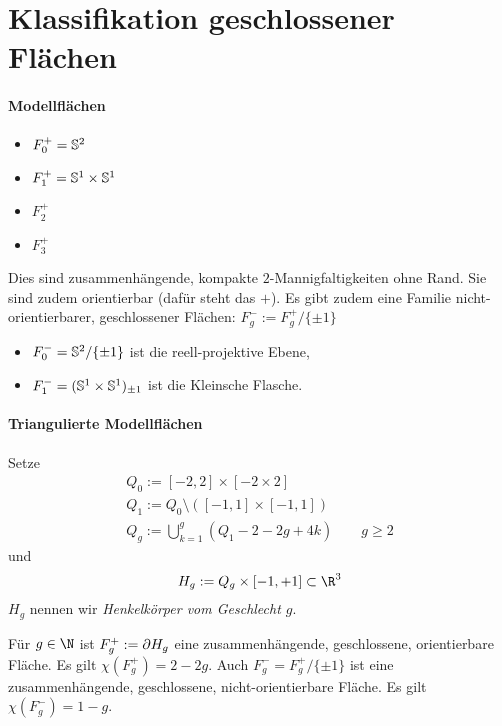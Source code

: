 \section{Klassifikation geschlossener Flächen}

\paragraph{Modellflächen}

\begin{ex}
	\begin{itemize}
		\item
			$F_0^+ = \S^2$
		\item
			$F_1^+ = \S^1 \times \S^1$
		\item
			$F_2^+$
		\item
			$F_3^+$
	\end{itemize}
	Dies sind zusammenhängende, kompakte $2$-Mannigfaltigkeiten ohne Rand.
	Sie sind zudem orientierbar (dafür steht das $+$).
	Es gibt zudem eine Familie nicht-orientierbarer, geschlossener Flächen: $F_g^- := F_g^+ / \{\pm 1\}$
	\begin{itemize}
		\item
			$F_0^- = \S^2 / \{\pm 1\}$ ist die reell-projektive Ebene,
		\item
			$F_1^- = (\S^1 \times \S^1)_{\pm 1}$ ist die Kleinsche Flasche.
	\end{itemize}
\end{ex}



\paragraph{Triangulierte Modellflächen} 

Setze
\begin{align*}
	Q_0 := [-2, 2] \times [-2 \times 2] \\
	Q_1 := Q_0 \setminus ([-1,1] \times [-1,1])\\
	Q_g := \bigcup_{k=1}^g (Q_1 - 2 - 2g + 4k) \qquad g \ge 2
\end{align*}
und
\[
	H_g := Q_g \times [-1,+1] \subset \R^3
\]
$H_g$ nennen wir \emph{Henkelkörper vom Geschlecht $g$}.

\begin{st}
	Für $g \in \N$ ist $F_g^+ := \boundary H_g$ eine zusammenhängende, geschlossene, orientierbare Fläche.
	Es gilt $\chi(F_g^+) = 2 - 2g$.
	Auch $F_g^- = F_g^+ / \{\pm 1\}$ ist eine zusammenhängende, geschlossene, nicht-orientierbare Fläche.
	Es gilt $\chi(F_g^-) = 1 - g$.
\end{st}

